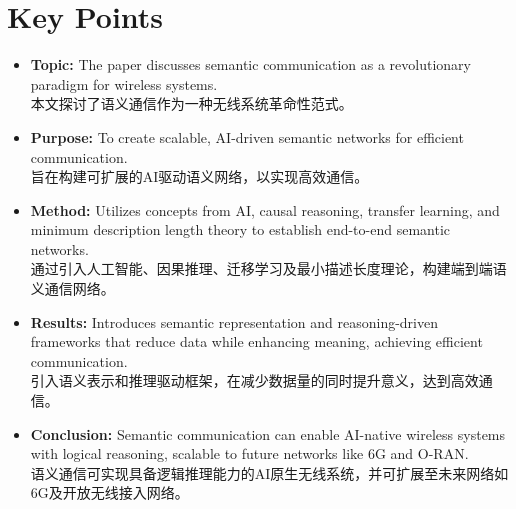 \documentclass[journal]{IEEEtran}
\begin{document}
\section{Key Points}
\begin{itemize}
    \item \textbf{Topic:} The paper discusses semantic communication as a revolutionary paradigm for wireless systems. \\本文探讨了语义通信作为一种无线系统革命性范式。
    \item \textbf{Purpose:} To create scalable, AI-driven semantic networks for efficient communication. \\旨在构建可扩展的AI驱动语义网络，以实现高效通信。
    \item \textbf{Method:} Utilizes concepts from AI, causal reasoning, transfer learning, and minimum description length theory to establish end-to-end semantic networks. \\通过引入人工智能、因果推理、迁移学习及最小描述长度理论，构建端到端语义通信网络。
    \item \textbf{Results:} Introduces semantic representation and reasoning-driven frameworks that reduce data while enhancing meaning, achieving efficient communication. \\引入语义表示和推理驱动框架，在减少数据量的同时提升意义，达到高效通信。
    \item \textbf{Conclusion:} Semantic communication can enable AI-native wireless systems with logical reasoning, scalable to future networks like 6G and O-RAN. \\语义通信可实现具备逻辑推理能力的AI原生无线系统，并可扩展至未来网络如6G及开放无线接入网络。
\end{itemize}



\end{document}
